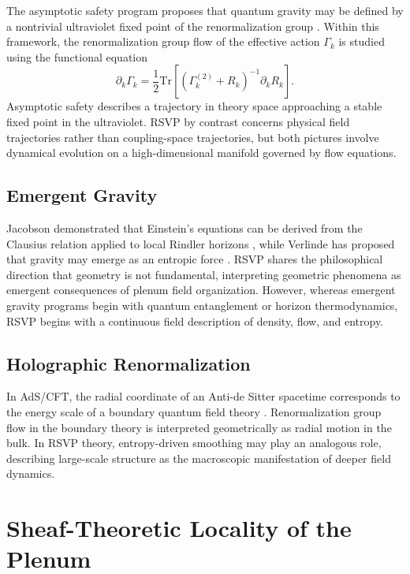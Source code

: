 \documentclass[12pt,a4paper]{article}
\theoremstyle{plain}
\theoremstyle{definition}
\theoremstyle{remark}
\begin{document}
The asymptotic safety program proposes that quantum gravity may be
defined by a nontrivial ultraviolet fixed point of the renormalization
group \cite{Weinberg1979,Reuter1998}. Within this framework, the
renormalization group flow of the effective action $\Gamma_k$ is
studied using the functional equation
\begin{equation}
\partial_k \Gamma_k =
\frac{1}{2}
\mathrm{Tr}\left[
(\Gamma_k^{(2)} + R_k)^{-1}\partial_k R_k
\right].
\end{equation}
Asymptotic safety describes a trajectory in theory space approaching
a stable fixed point in the ultraviolet. RSVP by contrast concerns
physical field trajectories rather than coupling-space trajectories,
but both pictures involve dynamical evolution on a high-dimensional
manifold governed by flow equations.

\subsection{Emergent Gravity}

Jacobson demonstrated that Einstein's equations can be derived from
the Clausius relation applied to local Rindler horizons
\cite{Jacobson1995}, while Verlinde has proposed that gravity may
emerge as an entropic force \cite{Verlinde2011}. RSVP shares the
philosophical direction that geometry is not fundamental, interpreting
geometric phenomena as emergent consequences of plenum field
organization. However, whereas emergent gravity programs begin with
quantum entanglement or horizon thermodynamics, RSVP begins with a
continuous field description of density, flow, and entropy.

\subsection{Holographic Renormalization}

In AdS/CFT, the radial coordinate of an Anti-de Sitter spacetime
corresponds to the energy scale of a boundary quantum field theory
\cite{Maldacena1998,RyuTakayanagi2006,Harlow2016}. Renormalization
group flow in the boundary theory is interpreted geometrically as
radial motion in the bulk. In RSVP theory, entropy-driven smoothing
may play an analogous role, describing large-scale structure as the
macroscopic manifestation of deeper field dynamics.

\section{Sheaf-Theoretic Locality of the Plenum}
\end{document}
